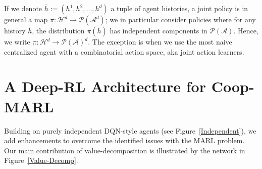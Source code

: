 \documentclass{article}
\begin{document}
If we denote $\bar h := (h^1,h^2,...,h^d)$ a tuple of agent histories, a joint policy is in general a map $\pi: \mathcal{H}^d \to \mathcal{P}(\mathcal{A}^d)$; we in particular consider policies where for any history $\bar{h}$, the distribution $\pi(\bar{h})$ has independent components in $\mathcal{P}(\mathcal{A})$. Hence, we write  $\pi:\mathcal{H}^d\to \mathcal{P}(\mathcal{A})^d$. The exception is when we use the most naive centralized agent with a combinatorial action space, aka joint action learners. 



\section{A Deep-RL Architecture for Coop-MARL}

Building on purely independent DQN-style agents (see Figure~\ref{Independent}), we add enhancements to overcome the identified issues with the MARL problem. Our main contribution of value-decomposition is illustrated by the network in Figure~\ref{Value-Decomp}.

 
\end{document}
